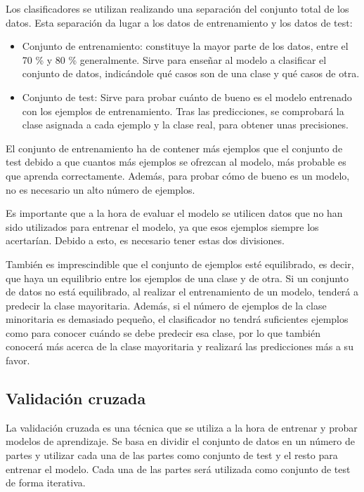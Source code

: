 Los clasificadores se utilizan realizando una separación del conjunto total de los datos. Esta separación da lugar a los datos de entrenamiento y los datos de test:

\begin{itemize}
	\item Conjunto de entrenamiento: constituye la mayor parte de los datos, entre el 70 \% y 80 \% generalmente. Sirve para enseñar al modelo a clasificar el conjunto de datos, indicándole qué casos son de una clase y qué casos de otra.
	\item Conjunto de test: Sirve para probar cuánto de bueno es el modelo entrenado con los ejemplos de entrenamiento. Tras las predicciones, se comprobará la clase asignada a cada ejemplo y la clase real, para obtener unas precisiones.
\end{itemize}

El conjunto de entrenamiento ha de contener más ejemplos que el conjunto de test debido a que cuantos más ejemplos se ofrezcan al modelo, más probable es que aprenda correctamente. Además, para probar cómo de bueno es un modelo, no es necesario un alto número de ejemplos.

Es importante que a la hora de evaluar el modelo se utilicen datos que no han sido utilizados para entrenar el modelo, ya que esos ejemplos siempre los acertarían. Debido a esto, es necesario tener estas dos divisiones.

También es imprescindible que el conjunto de ejemplos esté equilibrado, es decir, que haya un equilibrio entre los ejemplos de una clase y de otra. Si un conjunto de datos no está equilibrado, al realizar el entrenamiento de un modelo, tenderá a predecir la clase mayoritaria. Además, si el número de ejemplos de la clase minoritaria es demasiado pequeño, el clasificador no tendrá suficientes ejemplos como para conocer cuándo se debe predecir esa clase, por lo que también conocerá más acerca de la clase mayoritaria y realizará las predicciones más a su favor.

\subsection{Validación cruzada}
La validación cruzada es una técnica que se utiliza a la hora de entrenar y probar modelos de aprendizaje. Se basa en dividir el conjunto de datos en un número de partes y utilizar cada una de las partes como conjunto de test y el resto para entrenar el modelo. Cada una de las partes será utilizada como conjunto de test de forma iterativa.

